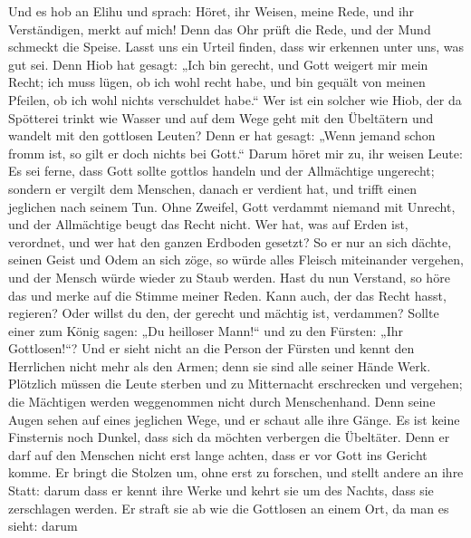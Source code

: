  Und es hob an Elihu und sprach:  Höret, ihr
Weisen, meine Rede, und ihr Verständigen, merkt auf mich! 
Denn das Ohr prüft die Rede, und der Mund schmeckt die Speise.
 Lasst uns ein Urteil finden, dass wir erkennen unter uns,
was gut sei.  Denn Hiob hat gesagt: „Ich bin gerecht, und
Gott weigert mir mein Recht;  ich muss lügen, ob ich wohl
recht habe, und bin gequält von meinen Pfeilen, ob ich wohl nichts
verschuldet habe.``  Wer ist ein solcher wie Hiob, der da
Spötterei trinkt wie Wasser  und auf dem Wege geht mit den
Übeltätern und wandelt mit den gottlosen Leuten?  Denn er
hat gesagt: „Wenn jemand schon fromm ist, so gilt er doch nichts bei
Gott.``  Darum höret mir zu, ihr weisen Leute: Es sei
ferne, dass Gott sollte gottlos handeln und der Allmächtige ungerecht;
 sondern er vergilt dem Menschen, danach er verdient hat,
und trifft einen jeglichen nach seinem Tun.  Ohne
Zweifel, Gott verdammt niemand mit Unrecht, und der Allmächtige beugt
das Recht nicht.  Wer hat, was auf Erden ist, verordnet,
und wer hat den ganzen Erdboden gesetzt?  So er nur an
sich dächte, seinen Geist und Odem an sich zöge,  so
würde alles Fleisch miteinander vergehen, und der Mensch würde wieder zu
Staub werden.  Hast du nun Verstand, so höre das und
merke auf die Stimme meiner Reden.  Kann auch, der das
Recht hasst, regieren? Oder willst du den, der gerecht und mächtig ist,
verdammen?  Sollte einer zum König sagen: „Du heilloser
Mann!{}`` und zu den Fürsten: „Ihr Gottlosen!{}``?  Und
er sieht nicht an die Person der Fürsten und kennt den Herrlichen nicht
mehr als den Armen; denn sie sind alle seiner Hände Werk.
 Plötzlich müssen die Leute sterben und zu Mitternacht
erschrecken und vergehen; die Mächtigen werden weggenommen nicht durch
Menschenhand.  Denn seine Augen sehen auf eines jeglichen
Wege, und er schaut alle ihre Gänge.  Es ist keine
Finsternis noch Dunkel, dass sich da möchten verbergen die Übeltäter.
 Denn er darf auf den Menschen nicht erst lange achten,
dass er vor Gott ins Gericht komme.  Er bringt die
Stolzen um, ohne erst zu forschen, und stellt andere an ihre Statt:
 darum dass er kennt ihre Werke und kehrt sie um des
Nachts, dass sie zerschlagen werden.  Er straft sie ab
wie die Gottlosen an einem Ort, da man es sieht:  darum
